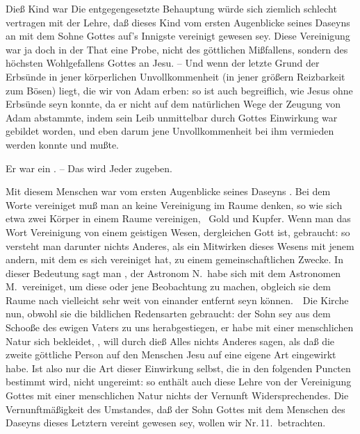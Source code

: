 \begin{aufza}
\item Dieß Kind war  Die entgegengesetzte Behauptung würde sich ziemlich schlecht vertragen mit der Lehre, daß dieses Kind vom ersten Augenblicke seines Daseyns an mit dem Sohne Gottes auf's Innigste vereinigt gewesen sey. Diese Vereinigung war ja doch in der That eine Probe, nicht des göttlichen Mißfallens, sondern des höchsten Wohlgefallens Gottes an Jesu. -- Und wenn der letzte Grund der Erbsünde in jener körperlichen Unvollkommenheit (in jener größern Reizbarkeit zum Bösen) liegt, die wir von Adam erben: so ist auch begreiflich, wie Jesus ohne Erbsünde seyn konnte, da er nicht auf dem natürlichen Wege der Zeugung von Adam abstammte, indem sein Leib unmittelbar durch Gottes Einwirkung war gebildet worden, und eben darum jene Unvollkommenheit bei ihm vermieden werden konnte und mußte.
\item Er war ein . -- Das wird Jeder zugeben.
\item Mit diesem Menschen war vom ersten Augenblicke seines Daseyns . Bei dem Worte vereiniget muß man an keine Vereinigung im Raume denken, so wie sich etwa zwei Körper in einem Raume vereinigen, \zB\ Gold und Kupfer. Wenn man das Wort Vereinigung von einem geistigen Wesen, dergleichen Gott ist, gebraucht: so versteht man darunter nichts Anderes, als ein Mitwirken dieses Wesens mit jenem andern, mit dem es sich vereiniget hat, zu einem gemeinschaftlichen Zwecke. In dieser Bedeutung sagt man \zB , der Astronom N.\ habe sich mit dem Astronomen M.\ vereiniget, um diese oder jene Beobachtung zu machen, obgleich sie dem Raume nach vielleicht sehr weit von einander entfernt seyn können.~\ Die Kirche nun, obwohl sie die bildlichen Redensarten gebraucht: der Sohn sey aus dem Schooße des ewigen Vaters zu uns herabgestiegen, er habe mit einer menschlichen Natur sich bekleidet, \udgl , will durch dieß Alles nichts Anderes sagen, als daß die zweite göttliche Person auf den Menschen Jesu auf eine eigene Art eingewirkt habe. Ist also nur die Art dieser Einwirkung selbst, die in den folgenden Puncten bestimmt wird, nicht ungereimt: so enthält auch diese Lehre von der Vereinigung Gottes mit einer menschlichen Natur nichts der Vernunft Widersprechendes. Die Vernunftmäßigkeit des Umstandes, daß der Sohn Gottes mit dem Menschen  des Daseyns dieses Letztern vereint gewesen sey, wollen wir Nr.\,11.\ betrachten.

\end{aufza}

